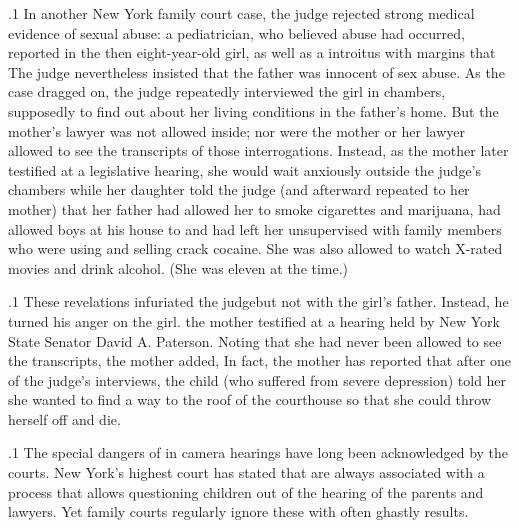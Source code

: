 \documentclass[11pt, twoside]{article}
\begin{document}
{\p.1{%
In another New York family court case, the judge rejected
strong medical evidence of sexual abuse: a pediatrician, who believed abuse had
occurred, reported  in the
then eight-year-old girl, as well as a  introitus with margins that  The judge nevertheless insisted that the father
was innocent of sex abuse. As the case dragged on, the judge repeatedly interviewed the girl in chambers, supposedly to find out about her
living conditions in the father’s home. But the mother’s lawyer was not
allowed inside; nor were the mother or her lawyer allowed to see the
transcripts of those interrogations. Instead, as the mother later testified at a legislative hearing, she would wait anxiously outside the judge’s
chambers while her daughter told the judge (and afterward repeated to
her mother) that her father had allowed her to smoke cigarettes and marijuana, had allowed boys at his house to  and had left her
unsupervised with family members who were using and selling crack cocaine. She was also allowed to watch X-rated movies and drink alcohol.
(She was eleven at the time.)
}%

\p.1{%
These revelations infuriated the judge\mdash{}but not with the girl’s father.
Instead, he turned his anger on the girl.
the mother testified at a hearing held by New York State Senator David
A. Paterson.  Noting that she had never been allowed to see the transcripts,
the mother added,  In
fact, the mother has reported that after one of the judge’s interviews, the
child (who suffered from severe depression) told her she wanted to find
a way to the roof of the courthouse so that she could throw herself off
and die.
}%

\p.1{%
The special dangers of in camera hearings have long been acknowledged by the courts. New York’s highest court has stated that  are always associated with a process that allows questioning children out of the hearing of the parents and lawyers. Yet family courts
regularly ignore these \mdash{}with often ghastly results.
}%


}
\end{document}
